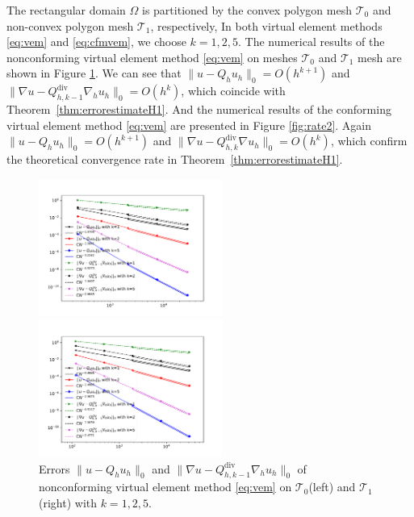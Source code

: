 \documentclass[10pt]{amsart}
\renewcommand{\div}{\operatorname{div}}
\numberwithin{equation}{section}
\begin{document}
The rectangular domain $\Omega$ is partitioned by the convex polygon mesh
$\mathcal T_0$ and non-convex polygon mesh $\mathcal T_1$, respectively, 
In both virtual element methods \eqref{eq:vem} and \eqref{eq:cfmvem}, we choose $k = 1, 2, 5$.
The numerical results of the nonconforming virtual element method \eqref{eq:vem} on meshes $\mathcal T_0$ and $\mathcal T_1$ mesh are shown in Figure \ref{fig:rate1}. We can see that $\|u - Q_h u_h\|_0=O(h^{k+1})$ and $\|\nabla u - Q_{h, k-1}^{\div}\nabla_h u_h\|_0=O(h^{k})$, which coincide with Theorem~\ref{thm:errorestimateH1}.
And the numerical results of the conforming virtual element method \eqref{eq:vem} are presented in Figure \ref{fig:rate2}. Again $\|u - Q_h u_h\|_0=O(h^{k+1})$ and $\|\nabla u - Q_{h, k}^{\div}\nabla u_h\|_0=O(h^{k})$, which confirm the
theoretical convergence rate in Theorem~\ref{thm:errorestimateH1}.
\begin{figure}[htbp]
\centering
\begin{minipage}[t]{0.49\linewidth}
\centering
\includegraphics[width=6cm]{./figures/ncvem_convex.pdf}
\end{minipage}%
\begin{minipage}[t]{0.49\linewidth}
\centering
\includegraphics[width=6cm]{./figures/ncvem_nonconvex.pdf}
\end{minipage}%
\centering
\caption{Errors $\|u - Q_h u_h\|_0$ and $\|\nabla u - Q_{h, k-1}^{\div}\nabla_h u_h\|_0$ 
of nonconforming virtual element method \eqref{eq:vem} on 
$\mathcal T_0$(left) and $\mathcal T_1$(right) with $k=1, 2, 5$.}
\label{fig:rate1}
\end{figure}
\end{document}
